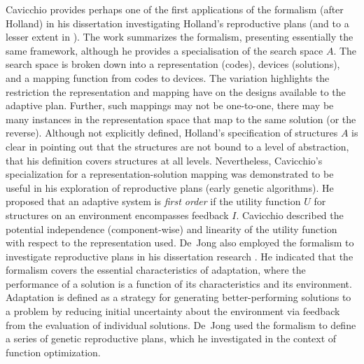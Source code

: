 \documentclass[a4paper, 11pt]{article}
\begin{document}
Cavicchio provides perhaps one of the first applications of the formalism (after Holland) in his dissertation investigating Holland's reproductive plans \cite{Cavicchio1970} (and to a lesser extent in \cite{Daniel1972}). The work summarizes the formalism, presenting essentially the same framework, although he provides a specialisation of the search space $A$. The search space is broken down into a representation (codes), devices (solutions), and a mapping function from codes to devices. The variation highlights the restriction the representation and mapping have on the designs available to the adaptive plan. Further, such mappings may not be one-to-one, there may be many instances in the representation space that map to the same solution (or the reverse). Although not explicitly defined, Holland's specification of structures $A$ is clear in pointing out that the structures are not bound to a level of abstraction, that his definition covers structures at all levels. Nevertheless, Cavicchio's specialization for a representation-solution mapping was demonstrated to be useful in his exploration of reproductive plans (early genetic algorithms). He proposed that an adaptive system is \emph{first order} if the utility function $U$ for structures on an environment encompasses feedback $I$. Cavicchio described the potential independence (component-wise) and linearity of the utility function with respect to the representation used. De~Jong also employed the formalism to investigate reproductive plans in his dissertation research \cite{Jong1975}. He indicated that the formalism covers the essential characteristics of adaptation, where the performance of a solution is a function of its characteristics and its environment. Adaptation is defined as a strategy for generating better-performing solutions to a problem by reducing initial uncertainty about the environment via feedback from the evaluation of individual solutions. De~Jong used the formalism to define a series of genetic reproductive plans, which he investigated in the context of function optimization.

\end{document}
